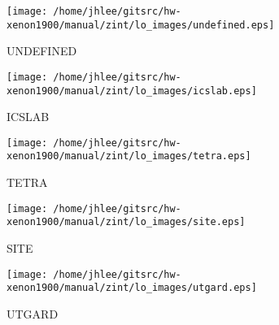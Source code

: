 \noindent
\vspace{1cm}
\begin{minipage}{.2\textwidth}
\begin{center}
\texttt{[image: /home/jhlee/gitsrc/hw-xenon1900/manual/zint/lo\_images/undefined.eps]}
\end{center}
\end{minipage}
\begin{minipage}{.7\textwidth}
UNDEFINED
\end{minipage}


\noindent
\vspace{1cm}
\begin{minipage}{.2\textwidth}
\begin{center}
\texttt{[image: /home/jhlee/gitsrc/hw-xenon1900/manual/zint/lo\_images/icslab.eps]}
\end{center}
\end{minipage}
\begin{minipage}{.7\textwidth}
ICSLAB
\end{minipage}


\noindent
\vspace{1cm}
\begin{minipage}{.2\textwidth}
\begin{center}
\texttt{[image: /home/jhlee/gitsrc/hw-xenon1900/manual/zint/lo\_images/tetra.eps]}
\end{center}
\end{minipage}
\begin{minipage}{.7\textwidth}
TETRA
\end{minipage}


\noindent
\vspace{1cm}
\begin{minipage}{.2\textwidth}
\begin{center}
\texttt{[image: /home/jhlee/gitsrc/hw-xenon1900/manual/zint/lo\_images/site.eps]}
\end{center}
\end{minipage}
\begin{minipage}{.7\textwidth}
SITE
\end{minipage}


\noindent
\vspace{1cm}
\begin{minipage}{.2\textwidth}
\begin{center}
\texttt{[image: /home/jhlee/gitsrc/hw-xenon1900/manual/zint/lo\_images/utgard.eps]}
\end{center}
\end{minipage}
\begin{minipage}{.7\textwidth}
UTGARD
\end{minipage}



